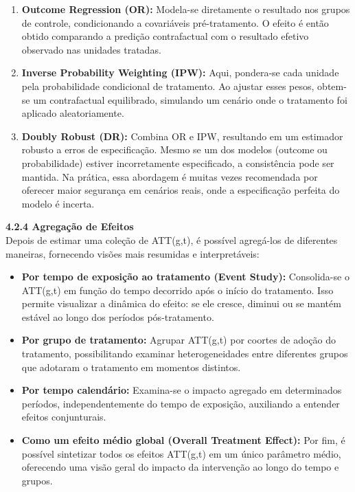\documentclass[
  brazilian,
  12pt,
  a4paper,
]{article}
\providecommand{\tightlist}{%
  \setlength{\itemsep}{0pt}\setlength{\parskip}{0pt}}
\begin{document}
\begin{enumerate}
\def\labelenumi{\arabic{enumi}.}
\tightlist
\item
  \textbf{Outcome Regression (OR):} Modela-se diretamente o resultado
  nos grupos de controle, condicionando a covariáveis pré-tratamento. O
  efeito é então obtido comparando a predição contrafactual com o
  resultado efetivo observado nas unidades tratadas.\\
\item
  \textbf{Inverse Probability Weighting (IPW):} Aqui, pondera-se cada
  unidade pela probabilidade condicional de tratamento. Ao ajustar esses
  pesos, obtem-se um contrafactual equilibrado, simulando um cenário
  onde o tratamento foi aplicado aleatoriamente.\\
\item
  \textbf{Doubly Robust (DR):} Combina OR e IPW, resultando em um
  estimador robusto a erros de especificação. Mesmo se um dos modelos
  (outcome ou probabilidade) estiver incorretamente especificado, a
  consistência pode ser mantida. Na prática, essa abordagem é muitas
  vezes recomendada por oferecer maior segurança em cenários reais, onde
  a especificação perfeita do modelo é incerta.
\end{enumerate}

\textbf{4.2.4 Agregação de Efeitos}\\
Depois de estimar uma coleção de ATT(g,t), é possível agregá-los de
diferentes maneiras, fornecendo visões mais resumidas e interpretáveis:

\begin{itemize}
\tightlist
\item
  \textbf{Por tempo de exposição ao tratamento (Event Study):}
  Consolida-se o ATT(g,t) em função do tempo decorrido após o início do
  tratamento. Isso permite visualizar a dinâmica do efeito: se ele
  cresce, diminui ou se mantém estável ao longo dos períodos
  pós-tratamento.\\
\item
  \textbf{Por grupo de tratamento:} Agrupar ATT(g,t) por coortes de
  adoção do tratamento, possibilitando examinar heterogeneidades entre
  diferentes grupos que adotaram o tratamento em momentos distintos.\\
\item
  \textbf{Por tempo calendário:} Examina-se o impacto agregado em
  determinados períodos, independentemente do tempo de exposição,
  auxiliando a entender efeitos conjunturais.\\
\item
  \textbf{Como um efeito médio global (Overall Treatment Effect):} Por
  fim, é possível sintetizar todos os efeitos ATT(g,t) em um único
  parâmetro médio, oferecendo uma visão geral do impacto da intervenção
  ao longo do tempo e grupos.
\end{itemize}
\end{document}
